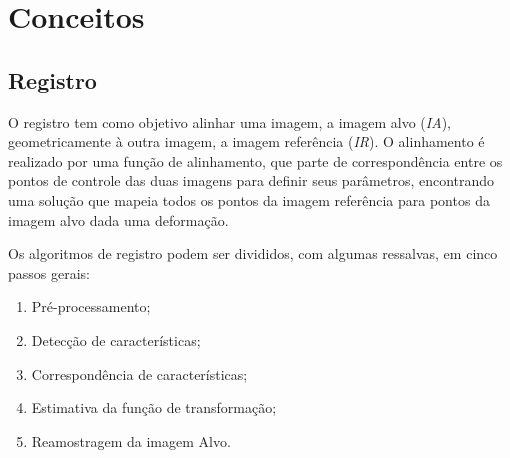 \chapter{Conceitos}
\label{cap:conceitos}

\section{Registro}
\label{sec:fundamentos}

  O registro tem como objetivo alinhar uma imagem, a imagem alvo (\textit{IA}),
geometricamente à outra imagem, a imagem referência (\textit{IR}). O alinhamento
é realizado por uma função de alinhamento, que parte de correspondência entre os
pontos de controle das duas imagens para definir seus parâmetros, encontrando uma
solução que mapeia todos os pontos da imagem referência para pontos da imagem alvo
dada uma deformação.

  Os algoritmos de registro podem ser divididos, com algumas ressalvas, em cinco
passos gerais:
\begin{enumerate}
    \item Pré-processamento;
    \item Detecção de características;
    \item Correspondência de características;
    \item Estimativa da função de transformação;
    \item Reamostragem da imagem Alvo.
\end{enumerate} %

